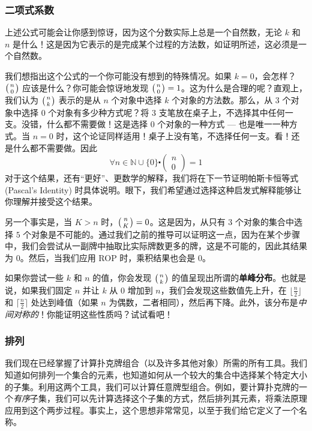 \subsubsection*{二项式系数}

上述公式可能会让你感到惊讶，因为这个分数实际上总是一个自然数，无论 $k$ 和 $n$ 是什么！这是因为它表示的是完成某个过程的方法数，如证明所述，这必须是一个自然数。

我们想指出这个公式的一个你可能没有想到的特殊情况。如果 $k = 0$，会怎样？$\big({n \atop 0}\big)$ 应该是什么？你可能会惊讶地发现 $\big({n \atop 0}\big)=1$。这为什么是合理的呢？直观上，我们认为 $\big({n \atop k}\big)$ 表示的是从 $n$ 个对象中选择 $k$ 个对象的方法数。那么，从 $3$ 个对象中选择 $0$ 个对象有多少种方式呢？将 $3$ 支笔放在桌子上，不选择其中任何一支。没错，什么都不需要做！这是选择 $0$ 个对象的一种方式 --- 也是唯一一种方式。当 $n = 0$ 时，这个论证同样适用！桌子上没有笔，不选择任何一支。看！还是什么都不需要做。因此
\[\forall n \in \mathbb{N} \cup \{0\} \centerdot \begin{pmatrix}
        n \\
        0
    \end{pmatrix}=1\]
对于这个结果，还有``更好''、更数学的解释，我们将在下一节证明帕斯卡恒等式 (Pascal's Identity) 时具体说明。眼下，我们希望通过选择这种启发式解释能够让你理解并接受这个结果。

另一个事实是，当 $K > n$ 时，$\big({n \atop K}\big) = 0$。这是因为，从只有 $3$ 个对象的集合中选择 $5$ 个对象是不可能的。通过我们之前的推导可以证明这一点，因为在某个步骤中，我们会尝试从一副牌中抽取比实际牌数更多的牌，这是不可能的，因此其结果为 $0$。然后，当我们应用 ROP 时，乘积结果也会是 $0$。

如果你尝试一些 $k$ 和 $n$ 的值，你会发现 $\big({n \atop k}\big)$ 的值呈现出所谓的\textbf{单峰分布}。也就是说，如果我们固定 $n$ 并让 $k$ 从 $0$ 增加到 $n$，我们会发现这些数值先上升，在 $\lfloor\frac{n}{2}\rfloor$ 和 $\lceil\frac{n}{2}\rceil$ 处达到峰值（如果 $n$ 为偶数，二者相同），然后再下降。此外，该分布是\emph{中间对称的}！你能证明这些性质吗？试试看吧！

\subsubsection*{排列}

我们现在已经掌握了计算扑克牌组合（以及许多其他对象）所需的所有工具。我们知道如何排列一个集合的元素，也知道如何从一个较大的集合中选择某个特定大小的子集。利用这两个工具，我们可以计算任意牌型组合。例如，要计算扑克牌的一个\emph{有序}子集，我们可以先计算选择这个子集的方式，然后排列其元素，将乘法原理应用到这个两步过程。事实上，这个思想非常常见，以至于我们给它定义了一个名称。

